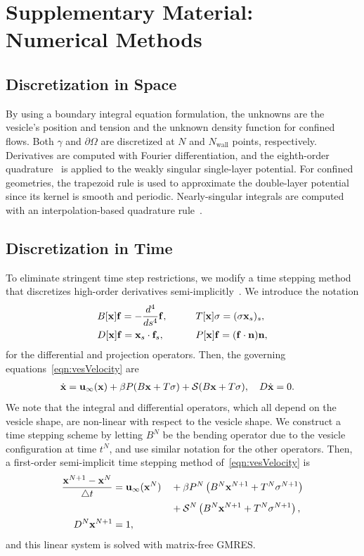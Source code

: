 \documentclass[9pt,twocolumn,twoside,lineno]{pnas-new}
\begin{document}
\section*{Supplementary Material: Numerical Methods}
\subsection*{Discretization in Space}
By using a boundary integral equation formulation, the unknowns are the
vesicle's position and tension and the unknown density function for
confined flows. Both $\gamma$ and $\partial\Omega$ are discretized at
$N$ and $N_\text{wall}$ points, respectively. Derivatives are computed
with Fourier differentiation, and the eighth-order
quadrature~\cite{alp1999} is applied to the weakly singular single-layer
potential. For confined geometries, the trapezoid rule is used to
approximate the double-layer potential since its kernel is smooth and
periodic. Nearly-singular integrals are computed with an
interpolation-based quadrature rule~\cite{qua-bir2014}.

\subsection*{Discretization in Time}
To eliminate stringent time step restrictions, we modify a time stepping
method that discretizes high-order derivatives
semi-implicitly~\cite{vee-gue-zor-bir2009}. We introduce the notation
\begin{alignat}{3}
  &B[\mathbf{x}]\mathbf{f} = -\frac{d^4}{ds^4} \mathbf{f},  \qquad
  &&T[\mathbf{x}]\sigma = (\sigma \mathbf{x}_s)_s, \\
  &D[\mathbf{x}]\mathbf{f} = \mathbf{x}_s \cdot \mathbf{f}_s, 
  &&P[\mathbf{x}]\mathbf{f} = (\mathbf{f} \cdot \mathbf{n}) \mathbf{n},
\end{alignat}
for the differential and projection operators. Then, the
governing equations~\eqref{eqn:vesVelocity} are
\begin{align}
  \dot{\mathbf{x}} &= \mathbf{u}_\infty(\mathbf{x}) + \beta P(B\mathbf{x} + T\sigma)
  + \mathcal{S} (B\mathbf{x} + T\sigma), \quad
  D \dot{\mathbf{x}} = 0.
\end{align}
We note that the integral and differential operators, which all depend
on the vesicle shape, are non-linear with respect to the vesicle
shape. We construct a time stepping scheme by letting $B^N$ be the
bending operator due to the vesicle configuration at time $t^N$, and use
similar notation for the other operators. Then, a first-order
semi-implicit time stepping method of~\eqref{eqn:vesVelocity} is
\begin{alignat}{3}  
  \frac{\mathbf{x}^{N+1} - \mathbf{x}^N}{\triangle t} &= \mathbf{u}_\infty(\mathbf{x}^N) 
  &&+ \beta P^N\left(B^N\mathbf{x}^{N+1} + T^N\sigma^{N+1}\right) \nonumber \\
  & &&+ \mathcal{S}^N\left(B^N\mathbf{x}^{N+1} + T^N\sigma^{N+1}\right),  \\
  D^N\mathbf{x}^{N+1} &= 1,
\end{alignat}
and this linear system is solved with matrix-free GMRES.
\end{document}
